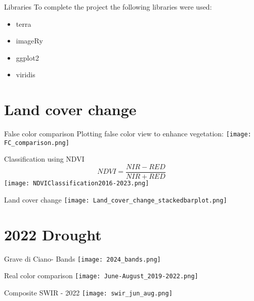 \documentclass{beamer}
\begin{document}
\begin{frame}{Libraries}
To complete the project the following libraries were used:
    \begin{itemize}
        \item terra
        \item imageRy
        \item ggplot2
        \item viridis
    \end{itemize}
\end{frame}


\section{Land cover change}


\begin{frame}{False color comparison}
        \centering
        Plotting false color view to enhance vegetation:
        \texttt{[image: FC\_comparison.png]}
\end{frame}


\begin{frame}{Classification using NDVI}
     \centering
        \begin{equation}
        NDVI=\frac{NIR-RED}{NIR+RED}
        \end{equation} 
    \texttt{[image: NDVIClassification2016-2023.png]}
\end{frame}

\begin{frame}{Land cover change}
     \centering
    \texttt{[image: Land\_cover\_change\_stackedbarplot.png]}
\end{frame}

\section{2022 Drought}


\begin{frame}{Grave di Ciano- Bands}
     \centering
    \texttt{[image: 2024\_bands.png]}
\end{frame}

\begin{frame}{Real color comparison}
     \centering
    \texttt{[image: June-August\_2019-2022.png]}
\end{frame}

\begin{frame}{Composite SWIR - 2022}
     \centering
    \texttt{[image: swir\_jun\_aug.png]}
\end{frame}
\end{document}
